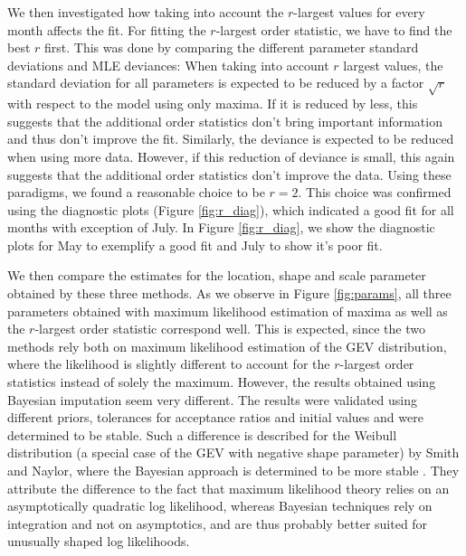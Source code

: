 \documentclass[10pt,conference,compsocconf]{IEEEtran}
\begin{document}
We then investigated how taking into account the $r$-largest values for every month affects the fit. For fitting the $r$-largest order statistic, we have to find the best $r$ first. This was done by comparing the different parameter standard deviations and MLE deviances: When taking into account $r$ largest values, the standard deviation for all parameters is expected to be reduced by a factor $\sqrt{r}$ with respect to the model using only maxima. If it is reduced by less, this suggests that the additional order statistics don't bring important information and thus don't improve the fit. Similarly, the deviance is expected to be reduced when using more data. However, if this reduction of deviance is small, this again suggests that the additional order statistics don't improve the data. Using these paradigms, we found a reasonable choice to be $r=2$. This choice was confirmed using the diagnostic plots (Figure \ref{fig:r_diag}), which indicated a good fit for all months with exception of July. In Figure \ref{fig:r_diag}, we show the diagnostic plots for May to exemplify a good fit and July to show it's poor fit. 
\par
We then compare the estimates for the location, shape and scale parameter obtained by these three methods. As we observe in Figure \ref{fig:params}, all three parameters obtained with maximum likelihood estimation of maxima as well as the $r$-largest order statistic correspond well. This is expected, since the two methods rely both on maximum likelihood estimation of the GEV distribution, where the likelihood is slightly different to account for the $r$-largest order statistics instead of solely the maximum. However, the results obtained using Bayesian imputation seem very different. The results were validated using different priors, tolerances for acceptance ratios and initial values and were determined to be stable. Such a difference is described for the Weibull distribution (a special case of the GEV with negative shape parameter) by Smith and Naylor, where the Bayesian approach is determined to be more stable \cite{Smith1987}. They attribute the difference to the fact that maximum likelihood theory relies on an asymptotically quadratic log likelihood, whereas Bayesian techniques rely on integration and not on asymptotics, and are thus probably better suited for unusually shaped log likelihoods. 
\end{document}
